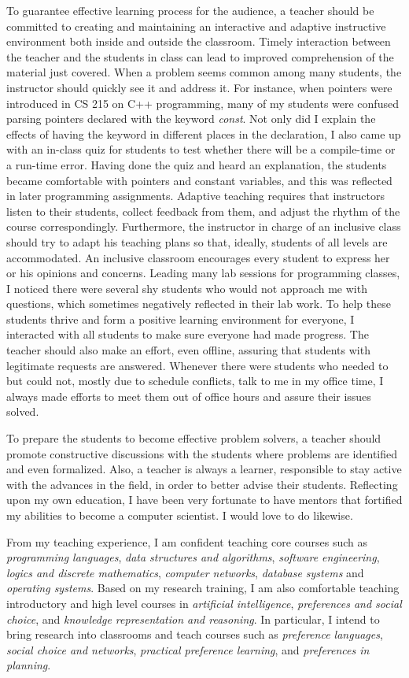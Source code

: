 \documentclass[12pt]{article}
\newcommand{\tit}[1]{\textit{#1}}
\begin{document}
To guarantee effective learning process for the audience, a teacher should be committed to
creating and maintaining an interactive and adaptive instructive environment both inside
and outside the classroom.
Timely interaction between the teacher and the students in class can lead to improved
comprehension of the material just covered.
When a problem seems common among many students, the instructor should quickly
see it and address it.
For instance, when pointers were introduced in CS 215 on C++ programming, 
many of my students were confused parsing pointers declared with the keyword \tit{const}.
Not only did I explain the effects of having the keyword in different places in the
declaration, I also came up with an in-class quiz for students to test whether there
will be a compile-time or a run-time error.
Having done the quiz and heard an explanation, the students became comfortable with
pointers and constant variables, and this was reflected in later programming assignments.
Adaptive teaching requires that instructors listen to their students, collect feedback
from them, and adjust the rhythm of the course correspondingly.
Furthermore, the instructor in charge of an inclusive class should try to adapt his teaching
plans so that, ideally, students of all levels are accommodated.
An inclusive classroom encourages every student to express her or his opinions and
concerns.  Leading many lab sessions for programming classes,
I noticed there were several shy students who would not approach me with questions,
which sometimes negatively reflected in their lab work.
To help these students thrive and form a positive learning environment for everyone, 
I interacted with all students to make sure everyone had made progress.
The teacher should also make an effort, even offline, assuring that students with legitimate
requests are answered.
Whenever there were students who needed to but could not, mostly due to schedule conflicts,
talk to me in my office time, I always made efforts to meet them out of office hours and
assure their issues solved.

To prepare the students to become effective problem solvers, a teacher should promote
constructive discussions with the students where problems are identified and even formalized.
Also, a teacher is always a learner, responsible to stay active with the advances in the
field, in order to better advise their students.
Reflecting upon my own education, I have been very fortunate to have mentors
that fortified my abilities to become a computer scientist.
I would love to do likewise.

From my teaching experience, I am confident teaching core courses such as
\tit{programming languages}, \tit{data structures and algorithms}, \tit{software engineering},
\tit{logics and discrete mathematics},
\tit{computer networks}, \tit{database systems} and \tit{operating systems}.
Based on my research training, I am also comfortable teaching introductory and high 
level courses in \tit{artificial intelligence},
\tit{preferences and social choice}, and \tit{knowledge representation and reasoning}.
In particular, I intend to bring research into classrooms and teach courses such as
\tit{preference languages}, \tit{social choice and networks},
\tit{practical preference learning}, and \tit{preferences in planning}.
\end{document}
